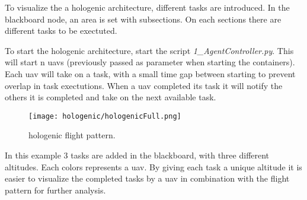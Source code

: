 To visualize the a hologenic architecture, different tasks are introduced. In the blackboard node, an area is set with subsections.
On each sections there are different tasks to be exectuted. 

To start the hologenic architecture, start the script \textit{1\_AgentController.py}. This will start n \acp{uav} (previously passed as parameter 
when starting the containers). Each \acs{uav} will take on a task, with a small time gap between starting to prevent overlap in task exectutions. 
When a \acs{uav} completed its task it will notify the others it is completed and take on the next available task.


\begin{figure}[ht]
    \centering
    \texttt{[image: hologenic/hologenicFull.png]}
    \caption[hologenic flight pattern]{hologenic flight pattern\footnotemark.}
\end{figure}

In this example 3 tasks are added in the blackboard, with three different altitudes. Each colors represents a \acs{uav}. 
By giving each task a unique altitude it is easier to visualize 
the completed tasks by a \acs{uav} in combination with the flight pattern for further analysis. 